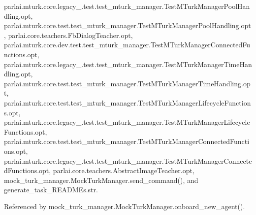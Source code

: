 parlai.\+mturk.\+core.\+legacy\+\_.\+test.\+test\+\_\+mturk\+\_\+manager.\+Test\+M\+Turk\+Manager\+Pool\+Handling.\+opt, parlai.\+mturk.\+core.\+test.\+test\+\_\+mturk\+\_\+manager.\+Test\+M\+Turk\+Manager\+Pool\+Handling.\+opt, parlai.\+core.\+teachers.\+Fb\+Dialog\+Teacher.\+opt, parlai.\+mturk.\+core.\+dev.\+test.\+test\+\_\+mturk\+\_\+manager.\+Test\+M\+Turk\+Manager\+Connected\+Functions.\+opt, parlai.\+mturk.\+core.\+legacy\+\_.\+test.\+test\+\_\+mturk\+\_\+manager.\+Test\+M\+Turk\+Manager\+Time\+Handling.\+opt, parlai.\+mturk.\+core.\+test.\+test\+\_\+mturk\+\_\+manager.\+Test\+M\+Turk\+Manager\+Time\+Handling.\+opt, parlai.\+mturk.\+core.\+test.\+test\+\_\+mturk\+\_\+manager.\+Test\+M\+Turk\+Manager\+Lifecycle\+Functions.\+opt, parlai.\+mturk.\+core.\+legacy\+\_.\+test.\+test\+\_\+mturk\+\_\+manager.\+Test\+M\+Turk\+Manager\+Lifecycle\+Functions.\+opt, parlai.\+mturk.\+core.\+test.\+test\+\_\+mturk\+\_\+manager.\+Test\+M\+Turk\+Manager\+Connected\+Functions.\+opt, parlai.\+mturk.\+core.\+legacy\+\_.\+test.\+test\+\_\+mturk\+\_\+manager.\+Test\+M\+Turk\+Manager\+Connected\+Functions.\+opt, parlai.\+core.\+teachers.\+Abstract\+Image\+Teacher.\+opt, mock\+\_\+turk\+\_\+manager.\+Mock\+Turk\+Manager.\+send\+\_\+command(), and generate\+\_\+task\+\_\+\+R\+E\+A\+D\+M\+Es.\+str.



Referenced by mock\+\_\+turk\+\_\+manager.\+Mock\+Turk\+Manager.\+onboard\+\_\+new\+\_\+agent().

